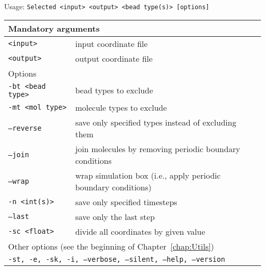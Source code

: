 \vspace{1em}
\noindent
Usage: \tt{Selected <input> <output> <bead type(s)> [options]}
\noindent
\begin{longtable}{p{}p{}}
  \toprule
  \multicolumn{2}{l}{Mandatory arguments}\\
  \midrule
  \tt{<input>}        & input coordinate file\\
  \tt{<output>}       & output coordinate file\\
  \midrule
  \multicolumn{2}{l}{Options}\\
  \midrule
  \tt{-bt <bead type>} & bead types to exclude\\
  \tt{-mt <mol type>}  & molecule types to exclude\\
  \tt{--reverse}       & save only specified types instead of excluding them\\
  \tt{--join}          & join molecules by removing periodic boundary
                         conditions\\
  \tt{--wrap}          & wrap simulation box (i.e., apply periodic boundary
                         conditions)\\
  \tt{-n <int(s)>}     & save only specified timesteps\\
  \tt{--last}          & save only the last step\\
  \tt{-sc <float>}     & divide all coordinates by given value\\
  \midrule
  \multicolumn{2}{l}{Other options (see the beginning of
                     Chapter~\ref{chap:Utils})}\\
  \midrule
  \multicolumn{2}{p{0.948\textwidth}}{\tt{-st},
                                      \tt{-e},
                                      \tt{-sk},
                                      \tt{-i},
                                      \tt{--verbose},
                                      \tt{--silent},
                                      \tt{--help},
                                      \tt{--version}}\\
  \bottomrule
\end{longtable}
